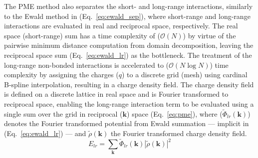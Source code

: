 The PME method also separates the short- and long-range interactions, similarly to the Ewald method in (Eq.~\ref{eq:ewald_sep}), where short-range and long-range interactions are evaluated in real and reciprocal space, respectively. The real space (short-range) sum has a time complexity of ($\mathcal{O}(N)$) by virtue of the pairwise minimum distance computation from domain decomposition, leaving the reciprocal space sum (Eq.~\ref{eq:ewald_lr}) as the bottleneck. The treatment of the long-range non-bonded interactions is accelerated to ($\mathcal{O}(N \log N)$) time complexity by assigning the charges ($q$) to a discrete grid (mesh) using cardinal B-spline interpolation, \cite{Essmann1995} resulting in a charge density field. The charge density field is defined on a discrete lattice in real space and is Fourier transformed to reciprocal space, enabling the long-range interaction term to be evaluated using a single sum over the grid in reciprocal ($\mathbf{k}$) space (Eq.~\ref{eq:pme}), where ($\tilde{\Phi}_{lr}(\mathbf{k})$) denotes the Fourier transformed potential from Ewald summation --- implicit in (Eq.~\ref{eq:ewald_lr}) --- and $\tilde{\rho}(\mathbf{k})$ the Fourier transformed charge density field.
%
\begin{equation} \label{eq:pme}
    E_{lr} = \sum_{\mathbf{k}} \tilde{\Phi}_{lr}(\mathbf{k}) \left| \tilde{\rho}(\mathbf{k})\right|^2  
\end{equation}
%
%
%
%
%
